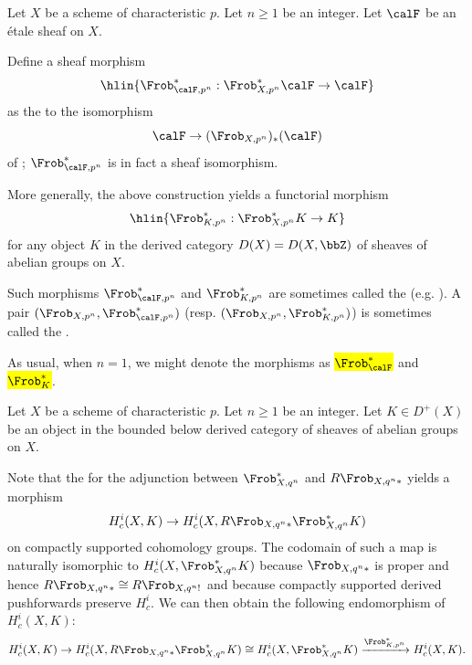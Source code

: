 \begin{definition}
    Let $X$ be a scheme of characteristic $p$. Let $n \geq 1$ be an integer. Let $\calF$ be an \'etale sheaf on $X$. 
    
    Define a sheaf morphism
    $$\hlin{\Frob_{\calF,p^n}^*: \Frob_{X,p^n}^* \calF \to \calF}$$
    as the  to the isomorphism 
    $$\calF \to (\Frob_{X,p^n})_*(\calF)$$
    of ; $\Frob_{\calF,p^n}^*$ is in fact a sheaf isomorphism. 

    More generally, the above construction yields a functorial morphism 
    $$\hlin{\Frob_{K,p^n}^*: \Frob_{X,p^n}^*K \to K}$$
    for any object $K$ in the derived category $D(X) = D(X,\bbZ)$ of sheaves of abelian groups on $X$.

    Such morphisms $\Frob_{\calF,p^n}^*$ and $\Frob_{K,p^n}^*$ are sometimes called the  (e.g. \cite[Chapter II Definition/Lemma 3.8]{kiehl_weissauer_wcps}). A pair $(\Frob_{X,p^n}, \Frob_{\calF,p^n}^*)$ (resp. $(\Frob_{X,p^n}, \Frob_{K,p^n}^*)$) is sometimes called the .

    As usual, when $n = 1$, we might denote the morphisms as \hl{$\Frob_{\calF}^*$} and \hl{$\Frob_K^*$}. 
\end{definition}

\begin{definition}
    Let $X$ be a scheme of characteristic $p$. Let $n \geq 1$ be an integer. Let $K \in D^+(X)$ be an object in the bounded below derived category of sheaves of abelian groups on $X$. 
    
    Note that the  for the adjunction between $\Frob_{X,q^n}^*$ and $R\Frob_{X,q^n*}$ yields a morphism 
    $$H_c^i(X, K) \to H_c^i(X, R\Frob_{X,q^n*} \Frob_{X,q^n}^* K)$$
    on compactly supported cohomology groups. The codomain of such a map is naturally isomorphic to $H_c^i(X, \Frob_{X,q^n}^* K)$ because $\Frob_{X,q^n*}$ is proper and hence $R\Frob_{X,q^n*} \cong R\Frob_{X,q^n!}$ and because compactly supported derived pushforwards preserve $H_c^i$. We can then obtain the following endomorphism of $H_c^i(X, K)$:
    $$H_c^i(X, K) \to H_c^i(X, R\Frob_{X,q^n*} \Frob_{X,q^n}^* K) \cong H_c^i(X, \Frob_{X,q^n}^* K) \xrightarrow{\Frob_{K,p^n}^*} H_c^i(X, K).$$
\end{definition}

